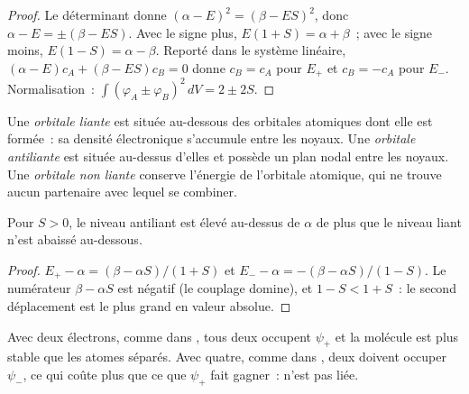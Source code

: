 \begin{proof}
Le déterminant donne $(\alpha - E)^2 = (\beta - ES)^2$, donc $\alpha - E = \pm(\beta - ES)$.
Avec le signe plus, $E(1 + S) = \alpha + \beta$~; avec le signe moins, $E(1 - S) = \alpha
- \beta$. Reporté dans le système linéaire, $(\alpha - E)c_A + (\beta - ES)c_B = 0$ donne $c_B
= c_A$ pour $E_+$ et $c_B = -c_A$ pour $E_-$. Normalisation~: $\int(\varphi_A \pm
\varphi_B)^2\,dV = 2 \pm 2S$.
\end{proof}

\begin{definition}\label{def:b2:diatomic-mos:bonding}
Une \emph{orbitale liante} est située au-dessous des orbitales atomiques dont elle
est formée~: sa densité électronique s'accumule entre les noyaux. Une
\emph{orbitale antiliante} est située au-dessus d'elles et possède un
plan nodal entre les noyaux. Une \emph{orbitale non liante}
conserve l'énergie de l'orbitale atomique, qui ne trouve aucun partenaire avec lequel
se combiner.
\end{definition}

\begin{proposition}\label{prop:b2:diatomic-mos:asymmetry}
Pour $S > 0$, le niveau antiliant est élevé au-dessus de $\alpha$ de plus que le
niveau liant n'est abaissé au-dessous.
\end{proposition}

\begin{proof}
$E_+ - \alpha = (\beta - \alpha S)/(1 + S)$ et $E_- - \alpha = -(\beta - \alpha S)/(1 - S)$.
Le numérateur $\beta - \alpha S$ est négatif (le couplage domine), et $1 - S < 1
+ S$~: le second déplacement est le plus grand en valeur absolue.
\end{proof}

Avec deux électrons, comme dans , tous deux occupent $\psi_+$ et la molécule est plus
stable que les atomes séparés. Avec quatre, comme dans , deux doivent occuper $\psi_-$,
ce qui coûte plus que ce que $\psi_+$ fait gagner~:  n'est pas liée.

